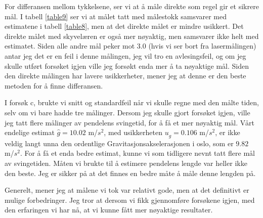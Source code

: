 For differansen mellom tykkelsene, ser vi at å måle direkte som regel gir et sikrere mål. I tabell \ref{table9} ser vi at målet tatt med målestokk samsvarer med estimatene i tabell \ref{table8}, men at det direkte målet er mindre usikkert. Det direkte målet med skyvelæren er også mer nøyaktig, men samsvarer ikke helt med estimatet. Siden alle andre mål peker mot 3.0 (hvis vi ser bort fra lasermålingen) antar jeg det er en feil i denne målingen, jeg vil tro en avlesingsfeil, og om jeg skulle utført forsøket igjen ville jeg forsøkt enda mer å ta nøyaktige mål.
Siden den direkte målingen har lavere usikkerheter, mener jeg at denne er den beste metoden for å finne differansen.\medskip

I forsøk c, brukte vi snitt og standardfeil når vi skulle regne med den målte tiden, selv om vi bare hadde tre målinger. Dersom jeg skulle gjort forsøket igjen, ville jeg tatt flere målinger av pendelens svingetid, for å få et mer nøyaktig mål. Vårt endelige estimat $\hat{g} = 10.02$ m/$s^2$, med usikkerheten $u_{\hat{g}} = 0.106$ m/$s^2$, er ikke veldig langt unna den ordentlige Gravitasjonsakselerasjonen i oslo, som er $9.82$ m/$s^2$. For å få et enda bedre estimat, kunne vi som tidligere nevnt tatt flere mål av svingetiden. Måten vi brukte til å estimere pendelens lengde var heller ikke den beste. Jeg er sikker på at det finnes en bedre måte å måle denne lengden på. \medskip

Generelt, mener jeg at målene vi tok var relativt gode, men at det definitivt er mulige forbedringer. Jeg tror at dersom vi fikk gjennomføre forsøkene igjen, med den erfaringen vi har nå, at vi kunne fått mer nøyaktige resultater.